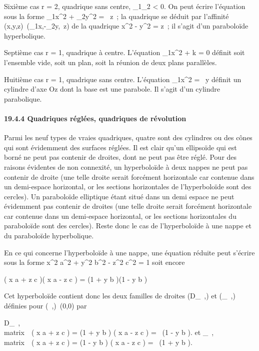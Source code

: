 \documentclass[]{article}
\begin{document}
Sixième cas r = 2, quadrique sans centre, \lambda_1\lambda_2
\textless{} 0. On peut écrire l'équation sous la forme
\lambda_1x^2 + \lambda_2y^2 = \beta~z~; la
quadrique se déduit par l'affinité
(x,y,z)\mapsto~(\sqrt\lambda_1x,\sqrt-\lambda_2y,\beta~z)
de la quadrique x^2 - y^2 = z~; il s'agit d'un
paraboloïde hyperbolique.

Septième cas r = 1, quadrique à centre. L'équation
\lambda_1x^2 + k = 0 définit soit l'ensemble vide, soit un
plan, soit la réunion de deux plans parallèles.

Huitième cas r = 1, quadrique sans centre. L'équation
\lambda_1x^2 = \beta~y définit un cylindre d'axe Oz dont la
base est une parabole. Il s'agit d'un cylindre parabolique.

\paragraph{19.4.4 Quadriques réglées, quadriques de révolution}

Parmi les neuf types de vraies quadriques, quatre sont des cylindres ou
des cônes qui sont évidemment des surfaces réglées. Il est clair qu'un
ellipsoïde qui est borné ne peut pas contenir de droites, dont ne peut
pas être réglé. Pour des raisons évidentes de non connexité, un
hyperboloïde à deux nappes ne peut pas contenir de droite (une telle
droite serait forcément horizontale car contenue dans un demi-espace
horizontal, or les sections horizontales de l'hyperboloïde sont des
cercles). Un paraboloïde elliptique étant situé dans un demi espace ne
peut évidemment pas contenir de droites (une telle droite serait
forcément horizontale car contenue dans un demi-espace horizontal, or
les sections horizontales du paraboloïde sont des cercles). Reste donc
le cas de l'hyperboloïde à une nappe et du paraboloïde hyperbolique.

En ce qui concerne l'hyperboloïde à une nappe, une équation réduite peut
s'écrire sous la forme  x^2 \over
a^2 + y^2 \over
b^2 - z^2 \over
c^2 = 1 soit encore

\left ( x \over a + z
\over c \right )\left (
x \over a - z \over c
\right ) = \left (1 + y
\over b \right )\left (1
- y \over b \right )

Cet hyperboloïde contient donc les deux familles de droites
(D_\lambda~,\mu) et (\Delta_\lambda~,\mu) définies pour
(\lambda~,\mu)\neq~(0,0) par

D_\lambda~,\mu \left
\\matrix\,\lambda~\left
( x \over a + z \over c
\right ) = \mu\left (1 + y
\over b \right ) \cr
\cr \mu\left ( x \over a
- z \over c \right ) =
\lambda~\left (1 - y \over b
\right )\right .\quad
\text et \quad \Delta_\lambda~,\mu
\left
\\matrix\,\lambda~\left
( x \over a + z \over c
\right ) = \mu\left (1 - y
\over b \right ) \cr
\cr \mu\left ( x \over a
- z \over c \right ) =
\lambda~\left (1 + y \over b
\right )\right .
\end{document}
